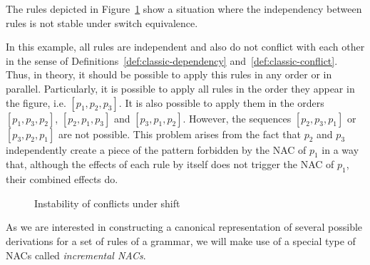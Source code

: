 \begin{example}\label{ex:process:instability}The rules depicted in Figure~\ref{fig:process:instability} show a situation where the independency between rules is not stable under switch equivalence.

  In this example, all rules are independent and also do not conflict with each other in the sense of Definitions~\ref{def:classic-dependency} and~\ref{def:classic-conflict}. Thus, in theory, it should be possible to apply this rules in any order or in parallel. Particularly, it is possible to apply all rules in the order they appear in the figure, i.e. $[p_1, p_2, p_3]$. It is also possible to apply them in the orders $[p_1, p_3, p_2]$, $[p_2, p_1, p_3]$ and $[p_3, p_1, p_2]$. However, the
  sequences $[p_2, p_3, p_1]$ or $[p_3, p_2, p_1]$ are not possible. This problem arises from the fact that $p_2$ and $p_3$ independently create a piece of the pattern forbidden by the NAC of $p_1$ in a way that, although the effects of each rule by itself does not trigger the NAC of $p_1$, their combined effects do.

\begin{figure}[!ht]
  \centering
  \caption{Instability of conflicts under shift\\}\label{fig:process:instability}
\end{figure}

\end{example}

As we are interested in constructing a canonical representation of several possible derivations for a set of rules of a grammar, we will make use of a special type of NACs called \emph{incremental NACs}.


